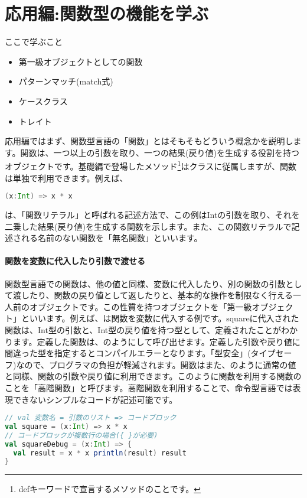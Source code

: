 \part{応用編:関数型の機能を学ぶ}
\begin{itembox}[l]{ここで学ぶこと}
\begin{itemize}
\item 第一級オブジェクトとしての関数
\item パターンマッチ(match式)
\item ケースクラス
\item トレイト
\end{itemize}
\end{itembox}

応用編ではまず、関数型言語の「関数」とはそもそもどういう概念かを説明します。関数は、一つ以上の引数を取り、一つの結果(戻り値)を生成する役割を持つオブジェクトです。基礎編で登場したメソッド\footnote{defキーワードで宣言するメソッドのことです。}はクラスに従属しますが、関数は単独で利用できます。例えば、
\begin{lstlisting}[language=scala, frame=none]
(x:Int) => x * x
\end{lstlisting}
は、「関数リテラル」と呼ばれる記述方法で、この例はIntの引数を取り、それを二乗した結果(戻り値)を生成する関数を示します。また、この関数リテラルで記述される名前のない関数を「無名関数」といいます。

\subsection{関数を変数に代入したり引数で渡せる}
関数型言語での関数は、他の値と同様、変数に代入したり、別の関数の引数として渡したり、関数の戻り値として返したりと、基本的な操作を制限なく行える一人前のオブジェクトです。この性質を持つオブジェクトを「第一級オブジェクト」といいます。例えば、は関数を変数に代入する例です。squareに代入された関数は、Int型の引数と、Int型の戻り値を持つ型として、定義されたことがわかります。定義した関数は、のようにして呼び出せます。定義した引数や戻り値に間違った型を指定するとコンパイルエラーとなります。「型安全」(タイプセーフ)なので、プログラマの負担が軽減されます。関数はまた、のように通常の値と同様、関数の引数や戻り値に利用できます。このように関数を利用する関数のことを「高階関数」と呼びます。高階関数を利用することで、命令型言語では表現できないシンプルなコードが記述可能です。

\begin{lstlisting}[language=scala, label=src:variable_function, caption=関数を変数に代入する例]
// val 変数名 = 引数のリスト => コードブロック
val square = (x:Int) => x * x
// コードブロックが複数行の場合({ }が必要)
val squareDebug = (x:Int) => {
  val result = x * x println(result) result
}
\end{lstlisting}

